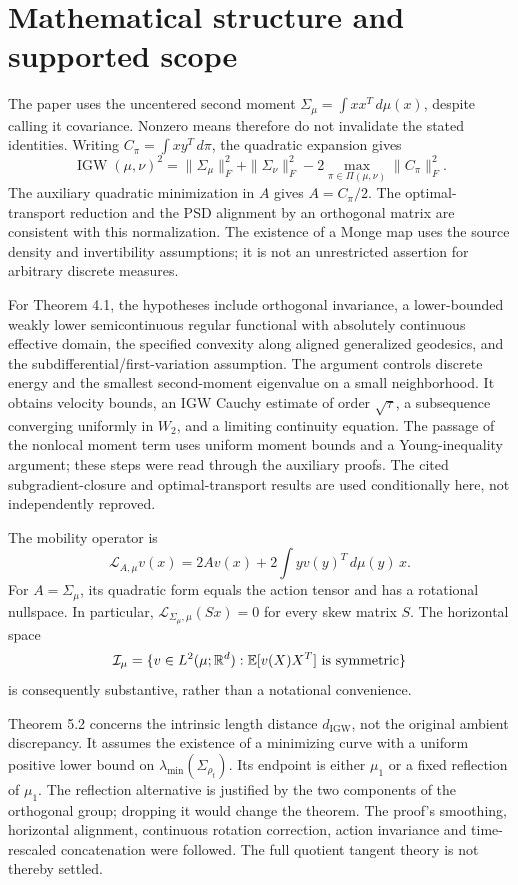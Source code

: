 \documentclass[10pt]{article}
\begin{document}
\section*{Mathematical structure and supported scope}
The paper uses the uncentered second moment \(\Sigma_\mu=\int xx^T\,d\mu(x)\), despite calling it covariance. Nonzero means therefore do not invalidate the stated identities. Writing \(C_\pi=\int xy^T\,d\pi\), the quadratic expansion gives \[\mathop{\mathrm{IGW}}(\mu,\nu)^2
 =\|\Sigma_\mu\|_F^2+\|\Sigma_\nu\|_F^2
       -2\max_{\pi\in\Pi(\mu,\nu)}\|C_\pi\|_F^2.\] The auxiliary quadratic minimization in \(A\) gives \(A=C_\pi/2\). The optimal-transport reduction and the PSD alignment by an orthogonal matrix are consistent with this normalization. The existence of a Monge map uses the source density and invertibility assumptions; it is not an unrestricted assertion for arbitrary discrete measures.\par
For Theorem 4.1, the hypotheses include orthogonal invariance, a lower-bounded weakly lower semicontinuous regular functional with absolutely continuous effective domain, the specified convexity along aligned generalized geodesics, and the subdifferential/first-variation assumption. The argument controls discrete energy and the smallest second-moment eigenvalue on a small neighborhood. It obtains velocity bounds, an IGW Cauchy estimate of order \(\sqrt{\tau}\), a subsequence converging uniformly in \(W_2\), and a limiting continuity equation. The passage of the nonlocal moment term uses uniform moment bounds and a Young-inequality argument; these steps were read through the auxiliary proofs. The cited subgradient-closure and optimal-transport results are used conditionally here, not independently reproved.\par
The mobility operator is \[\mathcal L_{A,\mu}v(x)=2Av(x)+2\int yv(y)^T\,d\mu(y)\,x.\] For \(A=\Sigma_\mu\), its quadratic form equals the action tensor and has a rotational nullspace. In particular, \(\mathcal L_{\Sigma_\mu,\mu}(Sx)=0\) for every skew matrix \(S\). The horizontal space \[\mathcal I_\mu=\{v\in L^2(\mu;\mathbb R^d):
                  \mathbb E[v(X)X^T]\ \hbox{is symmetric}\}\] is consequently substantive, rather than a notational convenience.\par
Theorem 5.2 concerns the intrinsic length distance \(d_{\mathop{\mathrm{IGW}}}\), not the original ambient discrepancy. It assumes the existence of a minimizing curve with a uniform positive lower bound on \(\lambda_{\min}(\Sigma_{\rho_t})\). Its endpoint is either \(\mu_1\) or a fixed reflection of \(\mu_1\). The reflection alternative is justified by the two components of the orthogonal group; dropping it would change the theorem. The proof’s smoothing, horizontal alignment, continuous rotation correction, action invariance and time-rescaled concatenation were followed. The full quotient tangent theory is not thereby settled.\par
\end{document}

